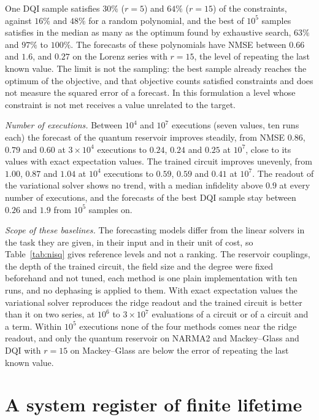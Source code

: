 \documentclass[journal]{IEEEtran}
\begin{document}
One DQI sample satisfies $30\%$ ($r=5$) and $64\%$ ($r=15$) of the constraints, against $16\%$ and $48\%$ for a random polynomial, and the best of $10^5$ samples satisfies in the median as many as the optimum found by exhaustive search, $63\%$ and $97\%$ to $100\%$. The forecasts of these polynomials have NMSE between $0.66$ and $1.6$, and $0.27$ on the Lorenz series with $r=15$, the level of repeating the last known value. The limit is not the sampling: the best sample already reaches the optimum of the objective, and that objective counts satisfied constraints and does not measure the squared error of a forecast. In this formulation a level whose constraint is not met receives a value unrelated to the target.

\emph{Number of executions.} Between $10^4$ and $10^7$ executions (seven values, ten runs each) the forecast of the quantum reservoir improves steadily, from NMSE $0.86$, $0.79$ and $0.60$ at $3\times10^4$ executions to $0.24$, $0.24$ and $0.25$ at $10^7$, close to its values with exact expectation values. The trained circuit improves unevenly, from $1.00$, $0.87$ and $1.04$ at $10^4$ executions to $0.59$, $0.59$ and $0.41$ at $10^7$. The readout of the variational solver shows no trend, with a median infidelity above $0.9$ at every number of executions, and the forecasts of the best DQI sample stay between $0.26$ and $1.9$ from $10^5$ samples on.

\emph{Scope of these baselines.} The forecasting models differ from the linear solvers in the task they are given, in their input and in their unit of cost, so Table~\ref{tab:nisq} gives reference levels and not a ranking. The reservoir couplings, the depth of the trained circuit, the field size and the degree were fixed beforehand and not tuned, each method is one plain implementation with ten runs, and no dephasing is applied to them. With exact expectation values the variational solver reproduces the ridge readout and the trained circuit is better than it on two series, at $10^6$ to $3\times10^7$ evaluations of a circuit or of a circuit and a term. Within $10^5$ executions none of the four methods comes near the ridge readout, and only the quantum reservoir on NARMA2 and Mackey--Glass and DQI with $r=15$ on Mackey--Glass are below the error of repeating the last known value.

\section{A system register of finite lifetime}
\label{sec:system}
\end{document}
